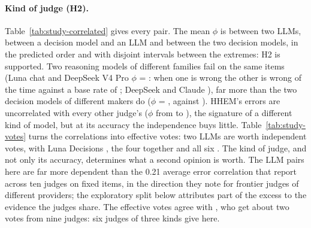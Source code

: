 \begin{table}[t]
\centering\small
{}
\caption{Effective independent votes of judge sets, $k/(1+(k-1)\bar\phi)$, on the items every judge of the set answered.}
\label{tab:study-votes}
\end{table}

\paragraph{Kind of judge (H2).} Table~\ref{tab:study-correlated} gives every pair. The mean $\phi$ is \studyHTwoMeanLl{} between two LLMs, \studyHTwoMeanDl{} between a decision model and an LLM and \studyHTwoMeanDd{} between the two decision models, in the predicted order and with disjoint intervals between the extremes: H2 is supported. Two reasoning models of different families fail on the same items (Luna chat and DeepSeek V4 Pro $\phi$ = \studyPhiLunaChatDeepseekPro{}: when one is wrong the other is wrong \studyCondLunaChatDeepseekPro{} of the time against a base rate of \studyBaseLunaChatDeepseekPro{}; DeepSeek and Claude \studyPhiDeepseekProClaude{}), far more than the two decision models of different makers do ($\phi$ = \studyPhiJevThreeLunaDecThree{}, \studyCondJevThreeLunaDecThree{} against \studyBaseJevThreeLunaDecThree{}). HHEM's errors are uncorrelated with every other judge's ($\phi$ from \studyPhiLunaDecThreeHhem{} to \studyPhiClaudeHhem{}), the signature of a different kind of model, but at its accuracy the independence buys little. Table~\ref{tab:study-votes} turns the correlations into effective votes: two LLMs are worth \studyVotesLunaChatDeepSeekPro{} independent votes, \jev{} with Luna Decisions \studyVotesJevLunaDecisionsTopThree{}, the four together \studyVotesJevLunaDecisionsLunaChatDeepSeekPro{} and all six \studyVotesAllSixTopThree{}. The kind of judge, and not only its accuracy, determines what a second opinion is worth. The LLM pairs here are far more dependent than the 0.21 average error correlation that \citet{hossain2026agreement} report across ten judges on fixed items, in the direction they note for frontier judges of different providers; the exploratory split below attributes part of the excess to the evidence the judges share. The effective votes agree with \citet{kohli2026nine}, who get about two votes from nine judges: six judges of three kinds give \studyVotesAllSixTopThree{} here.

\begin{table}[t]
\centering\small
{}
\caption{H4: error correlation within difficulty strata, items split by whether a third judge was right.}
\label{tab:study-h4}
\end{table}

